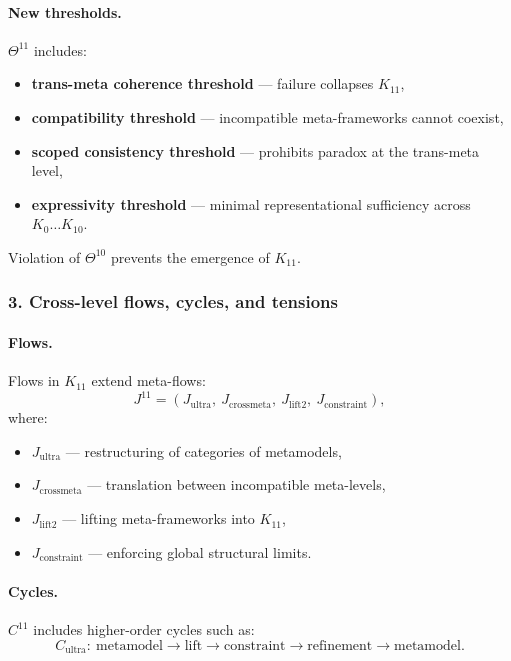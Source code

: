 \paragraph{New thresholds.}
$\Theta^{11}$ includes:
\begin{itemize}
  \item \textbf{trans-meta coherence threshold} — failure collapses $K_{11}$,
  \item \textbf{compatibility threshold} — incompatible meta-frameworks
        cannot coexist,
  \item \textbf{scoped consistency threshold} — prohibits paradox at the
        trans-meta level,
  \item \textbf{expressivity threshold} — minimal representational sufficiency
        across $K_0\dots K_{10}$.
\end{itemize}

Violation of $\Theta^{10}$ prevents the emergence of $K_{11}$.

\subsubsection{3. Cross-level flows, cycles, and tensions}

\paragraph{Flows.}
Flows in $K_{11}$ extend meta-flows:
\[
J^{11} = (J_{\mathrm{ultra}},\ J_{\mathrm{crossmeta}},\
         J_{\mathrm{lift2}},\ J_{\mathrm{constraint}}),
\]
where:
\begin{itemize}
  \item $J_{\mathrm{ultra}}$ — restructuring of categories of metamodels,
  \item $J_{\mathrm{crossmeta}}$ — translation between incompatible meta-levels,
  \item $J_{\mathrm{lift2}}$ — lifting meta-frameworks into $K_{11}$,
  \item $J_{\mathrm{constraint}}$ — enforcing global structural limits.
\end{itemize}

\paragraph{Cycles.}
$C^{11}$ includes higher-order cycles such as:
\[
C_{\mathrm{ultra}}:\
\text{metamodel} \rightarrow \text{lift} \rightarrow \text{constraint}
\rightarrow \text{refinement} \rightarrow \text{metamodel}.
\]

